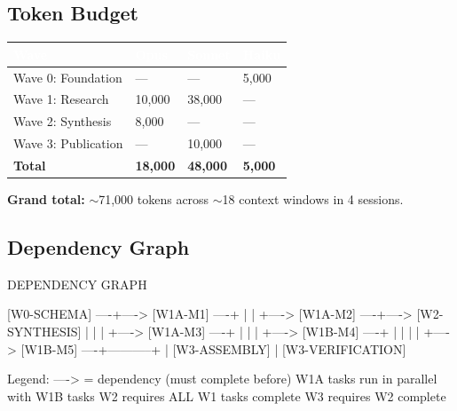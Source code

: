 \documentclass[11pt,letterpaper]{article}
\newcommand{\tableheader}[1]{\textbf{\sffamily\textcolor{white}{#1}}}
\begin{document}
\subsection{Token Budget}

\begin{center}
\begin{tabularx}{\textwidth}{L{4cm}C{2cm}C{2cm}C{2cm}}
\toprule
{}
\tableheader{Wave} & \tableheader{Opus} & \tableheader{Sonnet} & \tableheader{Haiku} \\
\midrule
Wave 0: Foundation & --- & --- & 5,000 \\
Wave 1: Research & 10,000 & 38,000 & --- \\
Wave 2: Synthesis & 8,000 & --- & --- \\
Wave 3: Publication & --- & 10,000 & --- \\
\midrule
\textbf{Total} & \textbf{18,000} & \textbf{48,000} & \textbf{5,000} \\
\bottomrule
\end{tabularx}
\end{center}

\textbf{Grand total:} $\sim$71,000 tokens across $\sim$18 context windows in 4 sessions.

\subsection{Dependency Graph}

\begin{asciibox}
DEPENDENCY GRAPH

  [W0-SCHEMA] ----+----> [W1A-M1] ----+
                   |                    |
                   +----> [W1A-M2] ----+----> [W2-SYNTHESIS]
                   |                    |           |
                   +----> [W1A-M3] ----+           |
                   |                               |
                   +----> [W1B-M4] ----+           |
                   |                    |           |
                   +----> [W1B-M5] ----+-----------+
                                                   |
                                          [W3-ASSEMBLY]
                                                   |
                                        [W3-VERIFICATION]

  Legend:
    ----> = dependency (must complete before)
    W1A tasks run in parallel with W1B tasks
    W2 requires ALL W1 tasks complete
    W3 requires W2 complete
\end{asciibox}
\end{document}
